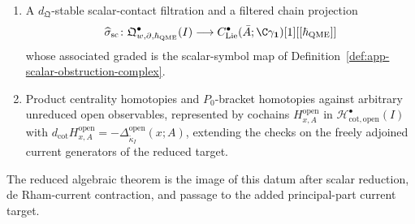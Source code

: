 \begin{defn}
\begin{enumerate}
\[    \]
    whose generator values are representatives
    \[
      u_{a(t)dt\otimes f}\longmapsto B_f^{\mathrm{BV}}(a),
      \qquad
      c_{B,\rho}\longmapsto\Theta_\rho^{\mathrm{BV}}(B).
    \]
    \item A \(d_{\mathfrak Q}\)-stable scalar-contact filtration and a
    filtered chain projection
    \[
      \widehat\sigma_{\mathrm{sc}}\colon
      \mathfrak Q^\bullet_{w,\partial,\hbar_{\mathrm{QME}}}(I)
      \longrightarrow
      C^\bullet_{\mathrm{Lie}}(\bar A;\C\gamma_{\mathbf 1})[1][[\hbar_{\mathrm{QME}}]]
    \]
    whose associated graded is the scalar-symbol map of
    Definition~\ref{def:app-scalar-obstruction-complex}.
		    \item Product centrality homotopies and \(P_0\)-bracket homotopies
		    against arbitrary unreduced open observables, represented by
		    cochains \(H^{\mathrm{open}}_{x,A}\) in
		    \(\mathcal H^\bullet_{\mathrm{cot,open}}(I)\) with
		    \(d_{\mathrm{cot}}H^{\mathrm{open}}_{x,A}
		    =-\Delta^{\mathrm{open}}_{\widetilde\kappa_I}(x;A)\), extending
		    the checks on the freely adjoined current generators of the
		    reduced target.
  \end{enumerate}
  The reduced algebraic theorem is the image of this datum after scalar
  reduction, de Rham-current contraction, and passage to the added
  principal-part current target.
\end{defn}


